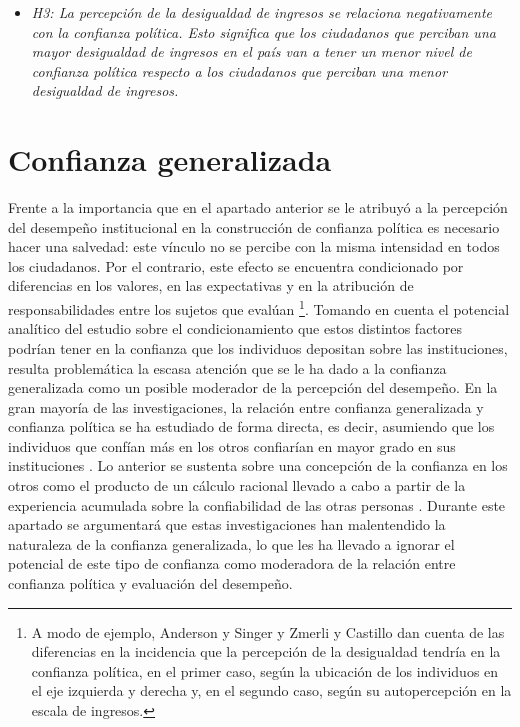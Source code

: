 \documentclass[12pt,twoside]{templates/facsothesis}
\providecommand{\tightlist}{%
  \setlength{\itemsep}{0pt}\setlength{\parskip}{0pt}}
\begin{document}
\begin{itemize}
\tightlist
\item
  \emph{H3: La percepción de la desigualdad de ingresos se relaciona negativamente con la confianza política. Esto significa que los ciudadanos que perciban una mayor desigualdad de ingresos en el país van a tener un menor nivel de confianza política respecto a los ciudadanos que perciban una menor desigualdad de ingresos.}
\end{itemize}

\section{Confianza generalizada}\label{confianza-generalizada}

Frente a la importancia que en el apartado anterior se le atribuyó a la percepción del desempeño institucional en la construcción de confianza política es necesario hacer una salvedad: este vínculo no se percibe con la misma intensidad en todos los ciudadanos. Por el contrario, este efecto se encuentra condicionado por diferencias en los valores, en las expectativas y en la atribución de responsabilidades entre los sujetos que evalúan \citep{vandermeerEconomicPerformancePolitical2018, vandermeerPoliticalTrustEvaluation2017} \footnote{A modo de ejemplo, Anderson y Singer \citeyearpar{andersonSensitiveLeftImpervious2008} y Zmerli y Castillo \citeyearpar{zmerliIncomeInequalityDistributive2015} dan cuenta de las diferencias en la incidencia que la percepción de la desigualdad tendría en la confianza política, en el primer caso, según la ubicación de los individuos en el eje izquierda y derecha y, en el segundo caso, según su autopercepción en la escala de ingresos.}. Tomando en cuenta el potencial analítico del estudio sobre el condicionamiento que estos distintos factores podrían tener en la confianza que los individuos depositan sobre las instituciones, resulta problemática la escasa atención que se le ha dado a la confianza generalizada como un posible moderador de la percepción del desempeño. En la gran mayoría de las investigaciones, la relación entre confianza generalizada y confianza política se ha estudiado de forma directa, es decir, asumiendo que los individuos que confían más en los otros confiarían en mayor grado en sus instituciones \citep{boothLegitimacyPuzzleLatin2009, mainwaringStateDeficienciesParty2006, mattesSocialPoliticalTrust2018, morrisCorruptionTrustTheoretical2010, zmerliWinnersLosersThree2013}. Lo anterior se sustenta sobre una concepción de la confianza en los otros como el producto de un cálculo racional llevado a cabo a partir de la experiencia acumulada sobre la confiabilidad de las otras personas \citep{newtonSocialPoliticalTrust2017}. Durante este apartado se argumentará que estas investigaciones han malentendido la naturaleza de la confianza generalizada, lo que les ha llevado a ignorar el potencial de este tipo de confianza como moderadora de la relación entre confianza política y evaluación del desempeño.
\end{document}
